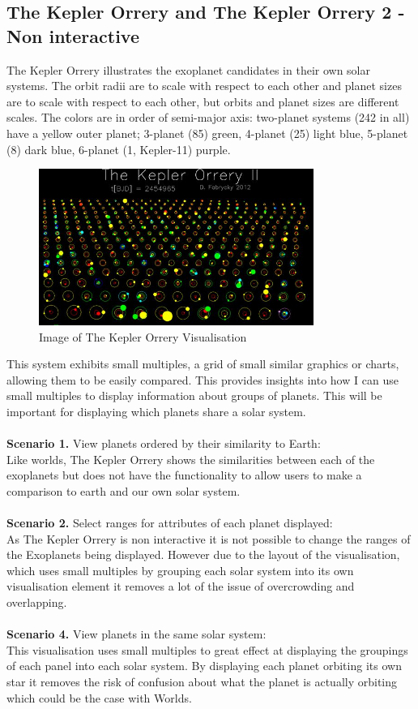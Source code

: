 \subsection{The Kepler Orrery and The Kepler Orrery 2 - Non interactive}
The Kepler Orrery \cite{orrery} illustrates the exoplanet candidates in their
own solar systems. The orbit radii are to scale with respect to each other and
planet sizes are to scale with respect to each other, but orbits and planet
sizes are different scales. The colors are in order of semi-major axis:
two-planet systems (242 in all) have a yellow outer planet; 3-planet (85) green,
4-planet (25) light blue, 5-planet (8) dark blue, 6-planet (1, Kepler-11)
purple. 
\begin{figure}[H]
  \centering
      \includegraphics[width=0.8\textwidth]{images/orrery.jpg}
  \caption{Image of The Kepler Orrery Visualisation}
\end{figure}
This system exhibits small multiples, a grid of small similar graphics or
charts, allowing them to be easily compared. This provides insights into how I
can use small multiples to display information about groups of planets. This
will be important for displaying which planets share a solar system.
\\\\
{\bf Scenario 1.} View planets ordered by their similarity to Earth:\\
Like worlds, The Kepler Orrery shows the similarities between each of the
exoplanets but does not have the functionality to allow users to make a
comparison to earth and our own solar system.
\\\\
{\bf Scenario 2.} Select ranges for attributes of each planet displayed:\\
As The Kepler Orrery is non interactive it is not possible to change the ranges
of the Exoplanets being displayed. However due to the layout of the
visualisation, which uses small multiples by grouping each solar system into its
own visualisation element it removes a lot of the issue of overcrowding and
overlapping.
\\\\
{\bf Scenario 4.} View planets in the same solar system:\\
This visualisation uses small multiples to great effect at displaying the
groupings of each panel into each solar system. By displaying each planet
orbiting its own star it removes the risk of confusion about what the planet is
actually orbiting which could be the case with Worlds.

